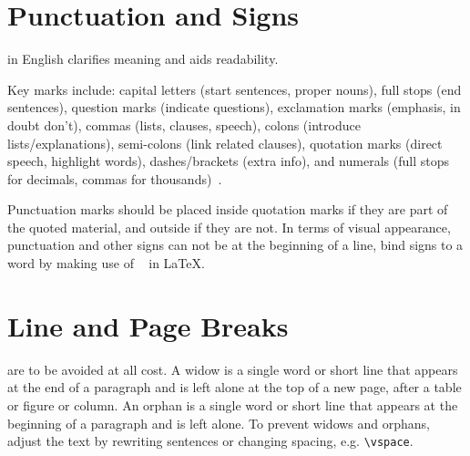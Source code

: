 \documentclass{../sharedAssets/tufte}
\begin{document}
\section{Punctuation and Signs}
 in English clarifies meaning and aids readability. 

Key marks include: capital letters (start sentences, proper nouns), 
full stops (end sentences), question marks (indicate questions), 
exclamation marks (emphasis, in doubt don't), commas (lists, clauses, speech), colons (introduce lists/explanations), 
semi-colons (link related clauses), quotation marks (direct speech, highlight words), 
dashes/brackets (extra info), and numerals (full stops for decimals, commas for thousands)~\cite{CambridgePunctuation}.

Punctuation marks should be placed inside quotation marks if they are part of the quoted material, and outside if they are not.
In terms of visual appearance, punctuation and other signs can not be at the beginning of a line, bind signs to a word by making use of ~ in LaTeX.

\section{Line and Page Breaks}
 are to be avoided at all cost.
A widow is a single word or short line that appears at the end of a paragraph and is left alone at the top of a new page, after a table or figure or column.
An orphan is a single word or short line that appears at the beginning of a paragraph and is left alone.
To prevent widows and orphans, adjust the text by rewriting sentences or changing spacing, e.g. \verb|\vspace|.   
\end{document}
